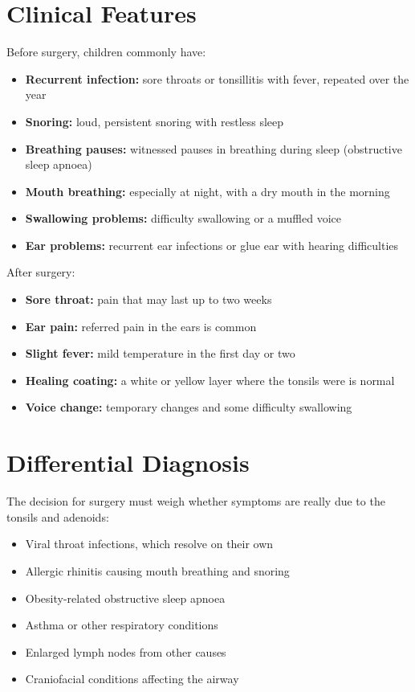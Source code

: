 \section*{Clinical Features}
Before surgery, children commonly have:

\begin{itemize}
    \item \textbf{Recurrent infection:} sore throats or tonsillitis with fever, repeated over the year
    \item \textbf{Snoring:} loud, persistent snoring with restless sleep
    \item \textbf{Breathing pauses:} witnessed pauses in breathing during sleep (obstructive sleep apnoea)
    \item \textbf{Mouth breathing:} especially at night, with a dry mouth in the morning
    \item \textbf{Swallowing problems:} difficulty swallowing or a muffled voice
    \item \textbf{Ear problems:} recurrent ear infections or glue ear with hearing difficulties
\end{itemize}

After surgery:

\begin{itemize}
    \item \textbf{Sore throat:} pain that may last up to two weeks
    \item \textbf{Ear pain:} referred pain in the ears is common
    \item \textbf{Slight fever:} mild temperature in the first day or two
    \item \textbf{Healing coating:} a white or yellow layer where the tonsils were is normal
    \item \textbf{Voice change:} temporary changes and some difficulty swallowing
\end{itemize}

\section*{Differential Diagnosis}
The decision for surgery must weigh whether symptoms are really due to the tonsils and adenoids:

\begin{itemize}
    \item Viral throat infections, which resolve on their own
    \item Allergic rhinitis causing mouth breathing and snoring
    \item Obesity-related obstructive sleep apnoea
    \item Asthma or other respiratory conditions
    \item Enlarged lymph nodes from other causes
    \item Craniofacial conditions affecting the airway
\end{itemize}

